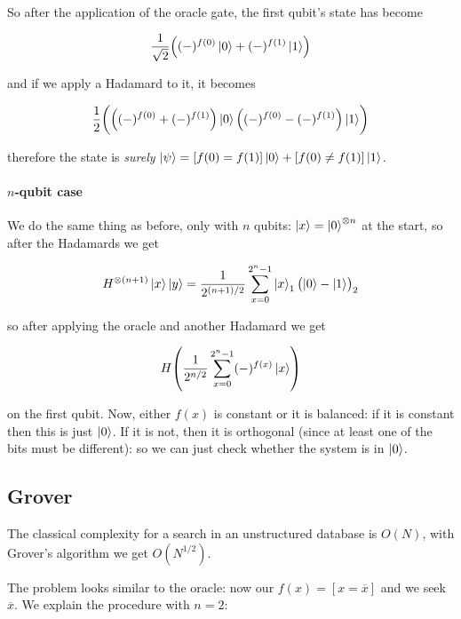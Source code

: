 \documentclass[main.tex]{subfiles}
\begin{document}
So after the application of the oracle gate, the first qubit's state has become

\begin{equation}
    \frac{1}{\sqrt{2}}\qty((-)^{f(0)} \ket{0} + (-)^{f(1)} \ket{1})
\end{equation}

and if we apply a Hadamard to it, it becomes

\begin{equation}
    \frac{1}{2} \qty(
    \qty((-)^{f(0)} + (-)^{f(1)}) \ket{0}
    \qty((-)^{f(0)} - (-)^{f(1)}) \ket{1}
    )
\end{equation}

therefore the state is \emph{surely} \(\ket{\psi}= [f(0)=f(1)] \ket{0} + [f(0) \neq f(1)]\ket{1} \).

\paragraph{$n$-qubit case}

We do the same thing as before, only with \(n\) qubits: \(\ket{x} = \ket{0}^{\otimes n}  \) at the start, so after the Hadamards we get

\begin{equation}
    H ^{\otimes (n+1)} \ket{x} \ket{y} = \frac{1}{2^{(n+1)/2}} \sum _{x=0}   ^{2^n-1} \ket{x}_1 \qty(\ket{0}- \ket{1})_2
\end{equation}

so after applying the oracle and another Hadamard we get

\begin{equation}
    H \qty(\frac{1}{2^{n/2}} \sum _{x=0}   ^{2^n-1} (-)^{f(x)} \ket{x})
\end{equation}

on the first qubit. Now, either \(f(x)\) is constant or it is balanced: if it is constant then this is just \(\ket{0} \). If it is not, then it is orthogonal (since at least one of the bits must be different): so we can just check whether the system is in \(\ket{0} \).

\subsection{Grover}

The classical complexity for a search in an unstructured database is \(O(N)\), with Grover's algorithm we get \(O(N^{1/2})\).

The problem looks similar to the oracle: now our \(f(x) = [x=\overline{x}]\) and we seek \(\overline{x} \). We explain the procedure with \(n=2\):
\end{document}
